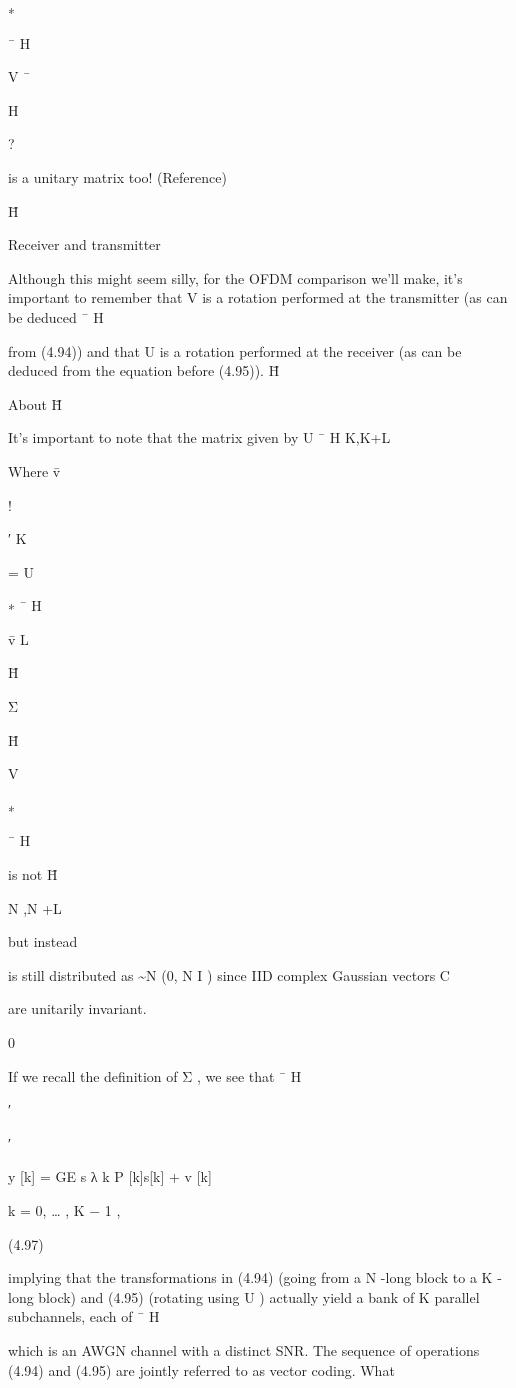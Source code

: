 {{{{{∗

¯
H

V ¯

H

?

is a unitary matrix too! (Reference)

H̄

​Receiver and transmitter

Although this might seem silly, for the OFDM comparison we'll make, it's important to remember that V is a rotation performed at the transmitter (as can be deduced
¯
H

from (4.94)) and that U is a rotation performed at the receiver (as can be deduced from the equation before (4.95)).
H̄

​About H̄

It's important to note that the matrix given by U
¯
H K,K+L

Where v̄

!

′
K

= U

∗
¯
H

v̄ L

H̄

Σ

H̄

V

∗

¯
H

is not H̄

N ,N +L

but instead

is still distributed as \sim N (0, N I ) since IID complex Gaussian vectors C

are unitarily invariant.

0

If we recall the definition of Σ , we see that
¯
H

′

′

y [k] = \sqrt GE s \sqrt λ k P [k]s[k] + v [k]

k = 0, … , K − 1 ,

(4.97)

implying that the transformations in (4.94) (going from a N -long block to a K -long block)
and (4.95) (rotating using U ) actually yield a bank of K parallel subchannels, each of
¯
H

which is an AWGN channel with a distinct SNR.
The sequence of operations (4.94) and (4.95) are jointly referred to as vector coding.
What

}}}}}
